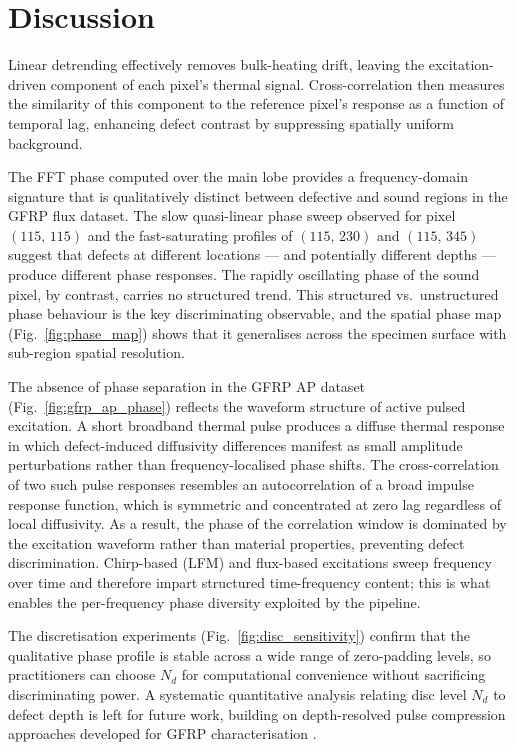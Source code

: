 \documentclass[conference]{IEEEtran}
\begin{document}
  \section{Discussion}

  Linear detrending effectively removes bulk-heating drift, leaving the
  excitation-driven component of each pixel's thermal signal. Cross-correlation
  then measures the similarity of this component to the reference pixel's
  response as a function of temporal lag, enhancing defect contrast by
  suppressing spatially uniform background.

  The FFT phase computed over the main lobe provides a frequency-domain
  signature that is qualitatively distinct between defective and sound regions
  in the GFRP flux dataset. The slow quasi-linear phase sweep observed for pixel
  $(115,\,115)$ and the fast-saturating profiles of $(115,\,230)$ and
  $(115,\,345)$ suggest that defects at different locations --- and potentially
  different depths --- produce different phase responses. The rapidly oscillating
  phase of the sound pixel, by contrast, carries no structured trend. This
  structured vs.\ unstructured phase behaviour is the key discriminating
  observable, and the spatial phase map (Fig.~\ref{fig:phase_map}) shows that it
  generalises across the specimen surface with sub-region spatial resolution.

  The absence of phase separation in the GFRP AP dataset
  (Fig.~\ref{fig:gfrp_ap_phase}) reflects the waveform structure of active
  pulsed excitation. A short broadband thermal pulse produces a diffuse thermal
  response in which defect-induced diffusivity differences manifest as small
  amplitude perturbations rather than frequency-localised phase shifts. The
  cross-correlation of two such pulse responses resembles an autocorrelation of
  a broad impulse response function, which is symmetric and concentrated at
  zero lag regardless of local diffusivity. As a result, the phase of the
  correlation window is dominated by the excitation waveform rather than
  material properties, preventing defect discrimination. Chirp-based (LFM) and
  flux-based excitations sweep frequency over time and therefore impart
  structured time-frequency content; this is what enables the per-frequency
  phase diversity exploited by the pipeline.

  The discretisation experiments (Fig.~\ref{fig:disc_sensitivity}) confirm that
  the qualitative phase profile is stable across a wide range of zero-padding
  levels, so practitioners can choose $N_d$ for computational convenience
  without sacrificing discriminating power. A systematic quantitative analysis
  relating disc level $N_d$ to defect depth is left for future work, building
  on depth-resolved pulse compression approaches developed for GFRP
  characterisation \cite{rani2020}.
\end{document}
